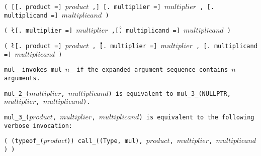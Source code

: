 
\s\s\s\tt{(} [[\tt{. product =}] $product$ \tt{,}]
[\tt{. multiplier =}] $multiplier$ \tt{,} [\tt{. multiplicand =}] $multiplicand$ \tt{)}

\s\tt{(} \l[\tt{. multiplier =}]
$multiplier$ \tt{,}\r [\tt{. multiplicand =}] $multiplicand$ \tt{)}

\s\tt{(} \l[\tt{. product =}] $product$ \tt{,}\r\
[\tt{. multiplier =}] $multiplier$ \tt{,} [\tt{. multiplicand =}] $multiplicand$ \tt{)}


\tt{mul_} invokes \tt{mul_}$n$\_ if the
expanded argument sequence contains $n$ arguments.

\tt{mul_2_(}$multiplier$\tt{,} $multiplicand$\tt{)} is equivalent to
\tt{mul_3_(NULLPTR,} $multiplier$\tt{,} $multiplicand$\tt{)}.

\tt{mul_3_(}$product$\tt{,} $multiplier$\tt{,} $multiplicand$\tt{)}
is equivalent to the following verbose invocation:

\enlargethispage*{\baselineskip}
\begin{center}
\tt{( (typeof_(}$product$\tt{)) call_((Type, mul),}
$product$\tt{,} $multiplier$\tt{,} $multiplicand$\tt{) )}
\end{center}
